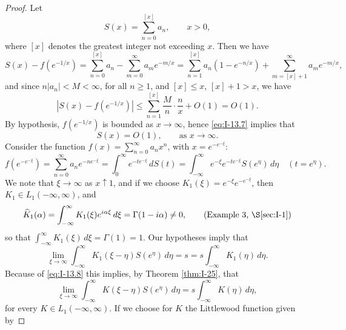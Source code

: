 \begin{proof}
Let
\begin{equation*}
S(x)=\sum_{n=0}^{[x]}a_n,\qquad x>0,
\end{equation*}
where $[x]$ denotes the greatest integer not exceeding $x$. Then we have
\begin{equation*}
S(x)-f(e^{-1/x})=\sum_{n=0}^{[x]}a_n-\sum_{m=0}^{\infty}a_m e^{-m/x}
=\sum_{n=1}^{[x]}a_n(1-e^{-n/x})+\sum_{m=[x]+1}^{\infty}a_m e^{-m/x},
\end{equation*}
and since $n|a_n|<M<\infty$, for all $n\ge 1$, and $[x]\le x$, $[x]+1>x$, we have
\begin{equation}\label{eq:I-13.7}\tag{13.7}
|S(x)-f(e^{-1/x})|\le\sum_{n=1}^{[x]}\frac{M}{n}\cdot\frac{n}{x}+O(1)=O(1).
\end{equation}
By hypothesis, $f(e^{-1/x})$ is bounded as $x\to\infty$, hence \eqref{eq:I-13.7} implies that
\begin{equation}\label{eq:I-13.8}\tag{13.8}
S(x)=O(1),\qquad\text{as }x\to\infty.
\end{equation}
Consider the function $f(x)=\sum_{n=0}^{\infty}a_nx^n$, with $x=e^{-e^{-\xi}}$:
\begin{equation*}
f(e^{-e^{-\xi}})=\sum_{n=0}^{\infty}a_ne^{-ne^{-\xi}}
=\int_{0}^{\infty}e^{-te^{-\xi}}\,dS(t)
=\int_{-\infty}^{\infty}e^{-\xi}e^{-te^{-\xi}}S(e^\eta)\,d\eta
\quad(t=e^\eta).
\end{equation*}
We note that $\xi\to\infty$ as $x\uparrow 1$, and if we choose $K_1(\xi)=e^{-\xi}e^{-e^{-\xi}}$, then $K_1\in L_1(-\infty,\infty)$, and
\begin{equation*}
\widehat K_1(\alpha)=\int_{-\infty}^{\infty}K_1(\xi)e^{i\alpha\xi}\,d\xi=\Gamma(1-i\alpha)\neq 0,\qquad\text{(Example 3, \S\ref{sec:I-1})}
\end{equation*}
so that $\int_{-\infty}^{\infty}K_1(\xi)\,d\xi=\Gamma(1)=1$. Our hypotheses imply that
\begin{equation}\label{eq:I-13.9}\tag{13.9}
\lim_{\xi\to\infty}\int_{-\infty}^{\infty}K_1(\xi-\eta)S(e^\eta)\,d\eta
=s=s\int_{-\infty}^{\infty}K_1(\eta)\,d\eta.
\end{equation}
Because of \eqref{eq:I-13.8} this implies, by Theorem \ref{thm:I-25}, that
\begin{equation}\label{eq:I-13.10}\tag{13.10}
\lim_{\xi\to\infty}\int_{-\infty}^{\infty}K(\xi-\eta)S(e^\eta)\,d\eta
=s\int_{-\infty}^{\infty}K(\eta)\,d\eta,
\end{equation}
for every $K\in L_1(-\infty,\infty)$. If we choose for $K$ the Littlewood function given by

\end{proof}
